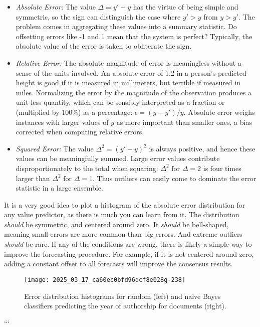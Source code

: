 \documentclass[10pt]{article}
\begin{document}
\begin{itemize}
  \item \textit{Absolute Error:} The value \(\Delta = y' - y\) has the virtue of being simple and symmetric, so the sign can distinguish the case where \(y' > y\) from \(y > y'\). The problem comes in aggregating these values into a summary statistic. Do offsetting errors like -1 and 1 mean that the system is perfect? Typically, the absolute value of the error is taken to obliterate the sign.

  \item \textit{Relative Error:} The absolute magnitude of error is meaningless without a sense of the units involved. An absolute error of 1.2 in a person's predicted height is good if it is measured in millimeters, but terrible if measured in miles. Normalizing the error by the magnitude of the observation produces a unit-less quantity, which can be sensibly interpreted as a fraction or (multiplied by 100\%) as a percentage: \(\epsilon = (y - y')/y\). Absolute error weighs instances with larger values of \(y\) as more important than smaller ones, a bias corrected when computing relative errors.

  \item \textit{Squared Error:} The value \(\Delta^{2} = (y' - y)^{2}\) is always positive, and hence these values can be meaningfully summed. Large error values contribute disproportionately to the total when squaring: \(\Delta^{2}\) for \(\Delta = 2\) is four times larger than \(\Delta^{2}\) for \(\Delta = 1\). Thus outliers can easily come to dominate the error statistic in a large ensemble.
\end{itemize}

It is a very good idea to plot a histogram of the absolute error distribution for any value predictor, as there is much you can learn from it. The distribution \textit{should} be symmetric, and centered around zero. It \textit{should} be bell-shaped, meaning small errors are more common than big errors. And extreme outliers \textit{should} be rare. If any of the conditions are wrong, there is likely a simple way to improve the forecasting procedure. For example, if it is not centered around zero, adding a constant offset to all forecasts will improve the consensus results.

\begin{figure}[h]
    \centering
    \texttt{[image: 2025\_03\_17\_ca60ec0bfd96dcf8e028g-238]}
    \caption{Error distribution histograms for random (left) and naive Bayes classifiers predicting the year of authorship for documents (right).}
\end{figure}
```
\end{document}
